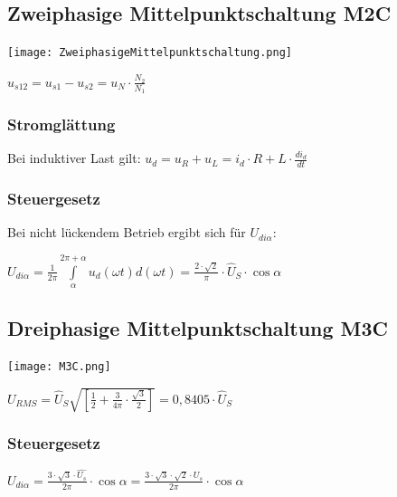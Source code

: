 \documentclass[german]{latex4ei/latex4ei_sheet}
\begin{document}
\begin{sectionbox}
		\subsection{Zweiphasige Mittelpunktschaltung M2C}
			\texttt{[image: ZweiphasigeMittelpunktschaltung.png]}

			$u_{s12} = u_{s1}-u_{s2} = u_N \cdot \frac{N_2}{N_1}$
			\subsubsection{Stromglättung}
				Bei induktiver Last gilt: $u_d = u_R + u_L = i_d\cdot R+L\cdot \frac{di_d}{dt}$
			\subsubsection{Steuergesetz}
				Bei nicht lückendem Betrieb ergibt sich für $U_{di\alpha}$:

				$U_{di\alpha} = \frac{1}{2\pi}\int\limits_\alpha^{2\pi+\alpha}u_d(\omega t)d(\omega  t) = \frac{2\cdot \sqrt{2}}{\pi}\cdot \hat{U}_S \cdot \cos \alpha$
		\subsection{Dreiphasige Mittelpunktschaltung M3C}
			\texttt{[image: M3C.png]}

			$U_{RMS} = \hat{U}_S \sqrt{\left[ \frac{1}{2}+\frac{3}{4\pi}\cdot \frac{\sqrt{3}}{2}\right]} = 0,8405\cdot \hat{U}_S$
			\subsubsection{Steuergesetz}
			$U_{di\alpha} = \frac{3\cdot \sqrt{3}\cdot \hat{U_s}}{2\pi}\cdot \cos \alpha = \frac{3\cdot \sqrt{3}\cdot \sqrt{2}\cdot U_{s}}{2\pi} \cdot \cos \alpha$

	\end{sectionbox}
\end{document}
